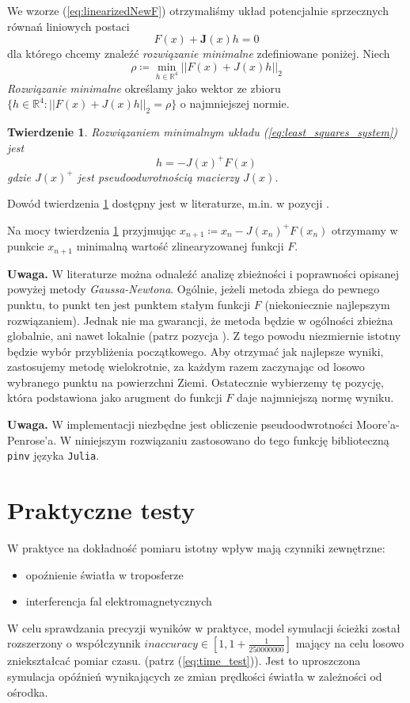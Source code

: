 \documentclass{article}
\newtheorem{theorem}{Twierdzenie}
\begin{document}
We wzorze (\ref{eq:linearizedNewF}) otrzymaliśmy układ potencjalnie sprzecznych równań liniowych postaci
\begin{equation}
    \label{eq:least_squares_system}
    F(x) + \mathbf{J}(x)h = 0
\end{equation}
dla którego chcemy znaleźć \textit{rozwiązanie minimalne} zdefiniowane poniżej. Niech
\[
    \rho \coloneqq \min_{h \in \mathbb{R}^4} ||F(x) + J(x)h||_2
\]
\textit{Rozwiązanie minimalne} określamy jako wektor ze zbioru $\{ h \in \mathbb{R}^4 : ||F(x) + J(x)h||_2 = \rho\}$
o najmniejszej normie.

\begin{theorem}
    \label{th:min_solution}
    Rozwiązaniem minimalnym układu (\ref{eq:least_squares_system}) jest
\[
    h = -J(x)^{+}F(x)
\]
gdzie $J(x)^{+}$ jest pseudoodwrotnością macierzy $J(x)$.
\end{theorem}
Dowód twierdzenia \ref{th:min_solution} dostępny jest w literaturze, m.in. w pozycji \cite{kincaid}.

Na mocy twierdzenia \ref{th:min_solution} przyjmując $x_{n+1} \coloneqq x_n -J(x_n)^{+}F(x_n)$ otrzymamy w
punkcie $x_{n+1}$ minimalną wartość zlinearyzowanej funkcji $F$.

\textbf{Uwaga.} \enspace W literaturze można odnaleźć analizę zbieżności i poprawności opisanej powyżej
metody \textit{Gaussa-Newtona}. Ogólnie, jeżeli metoda zbiega do pewnego punktu, to punkt ten jest punktem stałym
funkcji $F$ (niekoniecznie najlepszym rozwiązaniem). Jednak nie ma gwarancji, że metoda będzie w ogólności zbieżna
globalnie, ani nawet lokalnie (patrz pozycja \cite{gauss_newton_convergence}). Z tego powodu niezmiernie
istotny będzie wybór przybliżenia początkowego. Aby otrzymać jak najlepsze wyniki, zastosujemy metodę wielokrotnie,
za każdym razem zaczynając od losowo wybranego punktu na powierzchni Ziemi. Ostatecznie wybierzemy tę pozycję,
która podstawiona jako arugment do funkcji $F$ daje najmniejszą normę wyniku.

\textbf{Uwaga.} \enspace W implementacji niezbędne jest obliczenie pseudoodwrotności Moore'a-Penrose'a.
W niniejszym rozwiązaniu zastosowano do tego funkcję biblioteczną \texttt{pinv} języka \texttt{Julia}.

\section{Praktyczne testy}
\par W praktyce na dokładność pomiaru istotny wpływ mają czynniki zewnętrzne:
	\begin{itemize}
		\item opoźnienie światła w troposferze
		\item interferencja fal elektromagnetycznych
	\end{itemize}
\par W celu sprawdzania precyzji wyników w praktyce, model symulacji ścieżki został rozszerzony o współczynnik $ inaccuracy \in [1, 1 + \frac{1}{250000000} ] $ mający na celu losowo zniekształcać pomiar czasu. (patrz (\ref{eq:time_test})). Jest to uproszczona symulacja opóźnień wynikających ze zmian prędkości światła w zależności od ośrodka. 
\end{document}
